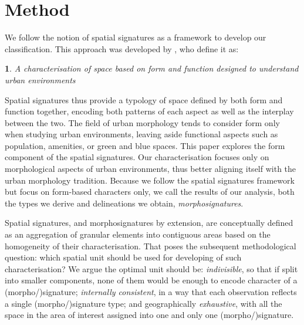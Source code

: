 \section{Method}
\label{sec:meth}

We follow the notion of spatial signatures as a framework
to develop our classification.
This approach was developed by \citep{dab_mf_2021}, who define it as:

\newtheorem*{theorem}{}
\begin{theorem}
    A characterisation of space based on form and function designed to understand urban
environments
\end{theorem}

Spatial signatures thus provide a typology of space defined by both form and function
together, encoding both patterns of each aspect as well as the interplay between the two. 
The field of urban morphology tends to consider form only when studying urban
environments, leaving aside functional aspects such as population, amenities,
or green and blue spaces. 
%
This paper explores the form component of the spatial signatures.
Our characterisation focuses only on morphological aspects of urban
environments, thus better aligning itself with the urban morphology tradition.
Because we follow the spatial signatures framework but focus on form-based
characters only, we call the results of our analysis, both the types we derive
and delineations we obtain, \textit{morphosignatures}.

Spatial signatures, and morphosignatures by extension, are conceptually defined as an aggregation of granular elements into
contiguous areas based on the homogeneity of their characterisation. That
poses the subsequent methodological question: which spatial unit should be
used for developing of such characterisation? We argue the optimal unit should
be: \textit{indivisible}, so that if split into
smaller components, none of them would be enough to encode character of a
(morpho/)signature;
\textit{internally consistent}, in a way that each observation reflects a single (morpho/)signature type;
and geographically \textit{exhaustive}, with all the space in the area of
interest assigned into one and only one (morpho/)signature.

